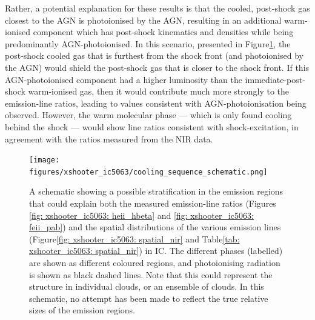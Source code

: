 Rather, a potential explanation for these results is that the cooled, post-shock gas closest to the AGN is photoionised by the AGN, resulting in an additional warm-ionised component which has post-shock kinematics and densities while being predominantly AGN-photoionised. In this scenario, presented in Figure\;\ref{fig: xshooter_ic5063: cooling_sequence_schematic}, the post-shock cooled gas that is furthest from the shock front (and photoionised by the AGN) would shield the post-shock gas that is closer to the shock front. If this AGN-photoionised component had a higher luminosity than the immediate-post-shock warm-ionised gas, then it would contribute much more strongly to the emission-line ratios, leading to values consistent with AGN-photoionisation being observed. However, the warm molecular phase --- which is only found cooling behind the shock --- would show line ratios consistent with shock-excitation, in agreement with the ratios measured from the NIR data.

\begin{figure}[!t]
    \centering
    \texttt{[image: figures/xshooter\_ic5063/cooling\_sequence\_schematic.png]}
    \caption[A schematic for the post-shock cooling sequence that could explain the observed locations, kinematics, and conditions of the various gas phases in IC.]{A schematic showing a possible stratification in the emission regions that could explain both the measured emission-line ratios (Figures \ref{fig: xshooter_ic5063: heii_hbeta} and \ref{fig: xshooter_ic5063: feii_pab}) and the spatial distributions of the various emission lines (Figure\;\ref{fig: xshooter_ic5063: spatial_nir} and Table\;\ref{tab: xshooter_ic5063: spatial_nir}) in IC. The different phases (labelled) are shown as different coloured regions, and photoionising radiation is shown as black dashed lines. Note that this could represent the structure in individual clouds, or an ensemble of clouds. In this schematic, no attempt has been made to reflect the true relative sizes of the emission regions.}
    \label{fig: xshooter_ic5063: cooling_sequence_schematic}
\end{figure}

